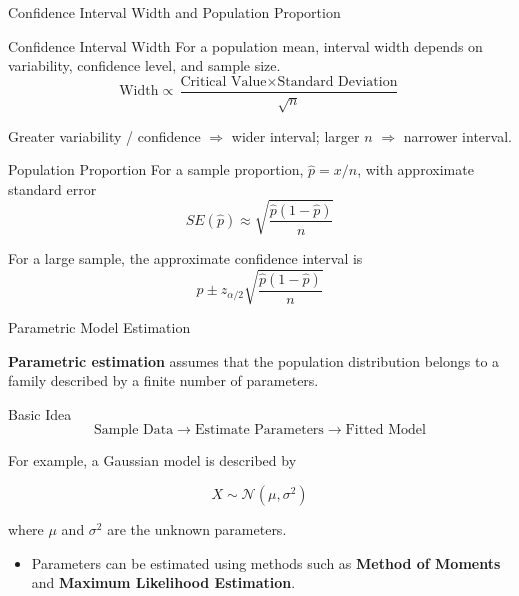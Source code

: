 \documentclass{beamer}
\begin{document}
\begin{frame}{Confidence Interval Width and Population Proportion}

\begin{block}{Confidence Interval Width}
\small
For a population mean, interval width depends on variability,
confidence level, and sample size.
\[
\boxed{
\text{Width}
\propto
\frac{\text{Critical Value}\times\text{Standard Deviation}}
{\sqrt{n}}
}
\]

\item Greater variability / confidence $\Rightarrow$ wider interval;
      larger $n$ $\Rightarrow$ narrower interval.
\end{block}

\vspace{-2mm}

\begin{block}{Population Proportion}
\small
For a sample proportion, $\hat p=x/n$, with approximate standard error
\[
\boxed{
SE(\hat p)
\approx
\sqrt{\frac{\hat p(1-\hat p)}{n}}
}
\]

For a large sample, the approximate confidence interval is
\[
\boxed{
\hat p
\pm
z_{\alpha/2}
\sqrt{\frac{\hat p(1-\hat p)}{n}}
}
\]
\end{block}

\end{frame}


\begin{frame}{Parametric Model Estimation}

\textbf{Parametric estimation} assumes that the population
distribution belongs to a family described by a finite number
of parameters.

\begin{block}{Basic Idea}
\[
\text{Sample Data}
\longrightarrow
\text{Estimate Parameters}
\longrightarrow
\text{Fitted Model}
\]
\end{block}

For example, a Gaussian model is described by

\[
\boxed{
X\sim\mathcal{N}(\mu,\sigma^2)
}
\]

where $\mu$ and $\sigma^2$ are the unknown parameters.

\begin{itemize}
    \item Parameters can be estimated using methods such as
          \textbf{Method of Moments} and \textbf{Maximum Likelihood Estimation}.
\end{itemize}

\end{frame}
\end{document}
